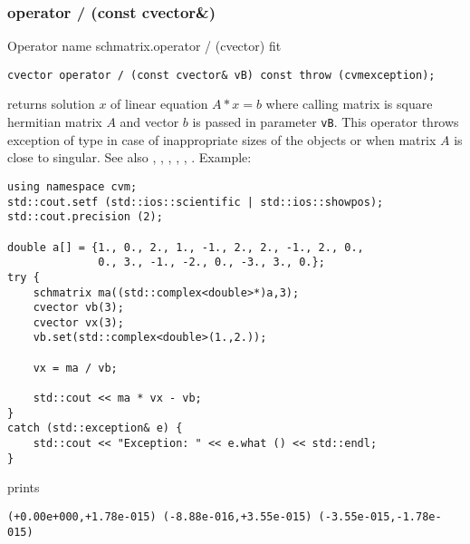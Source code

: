 \subsubsection{operator / (const cvector\&)}
Operator%
\pdfdest name {schmatrix.operator / (cvector)} fit
\begin{verbatim}
cvector operator / (const cvector& vB) const throw (cvmexception);
\end{verbatim}
returns solution $x$ of linear equation
$A*x=b$ where calling matrix is square hermitian matrix $A$
and vector $b$ is passed in parameter \verb"vB".
This operator throws exception 
of type 
in case of inappropriate sizes
of the objects or when  matrix $A$ is close to singular.
See also , 
, 
, 
, , .
Example:
\begin{Verbatim}
using namespace cvm;
std::cout.setf (std::ios::scientific | std::ios::showpos);
std::cout.precision (2);

double a[] = {1., 0., 2., 1., -1., 2., 2., -1., 2., 0.,
              0., 3., -1., -2., 0., -3., 3., 0.};
try {
    schmatrix ma((std::complex<double>*)a,3);
    cvector vb(3);
    cvector vx(3);
    vb.set(std::complex<double>(1.,2.));

    vx = ma / vb;

    std::cout << ma * vx - vb;
}
catch (std::exception& e) {
    std::cout << "Exception: " << e.what () << std::endl;
}
\end{Verbatim}
prints
\begin{Verbatim}
(+0.00e+000,+1.78e-015) (-8.88e-016,+3.55e-015) (-3.55e-015,-1.78e-015)
\end{Verbatim}
\newpage



